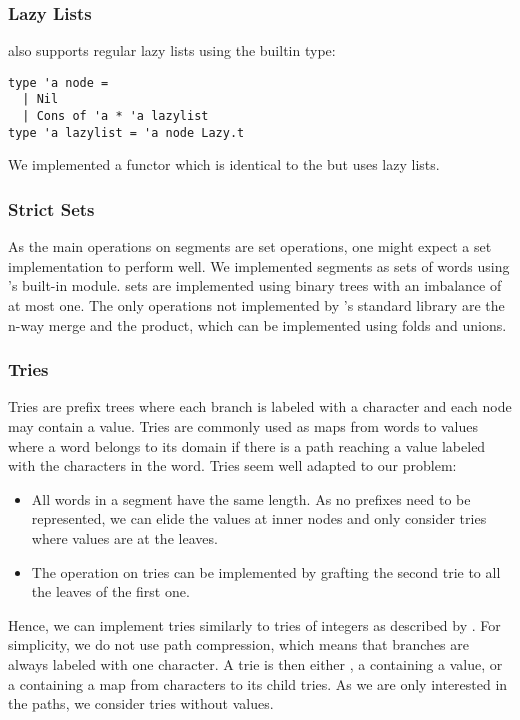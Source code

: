 \subsubsection{Lazy Lists}

\ocaml also supports regular lazy lists using the builtin  type:

\begin{lstlisting}
type 'a node =
  | Nil
  | Cons of 'a * 'a lazylist
type 'a lazylist = 'a node Lazy.t
\end{lstlisting}

We implemented a  functor which is identical to the
 but uses lazy lists.

\subsubsection{Strict Sets}

As the main operations on segments are set operations, one might 
expect a set implementation to perform well. We implemented segments as sets
of words using \ocaml's built-in  module. \ocaml sets are implemented
using binary trees with an imbalance of at most one.
The only operations not implemented by \ocaml's standard library are
the n-way merge and the product, which can be implemented using folds and unions.

\subsubsection{Tries}

Tries \cite{Fredkin1960} are prefix trees where each branch is labeled
with a character and each node may contain a value. Tries are commonly used
as maps from words to values where a word belongs to its domain if there is a
path reaching a value labeled with the characters in the word.
Tries seem well adapted to our problem:
\begin{itemize}[leftmargin=*]
\item All words in a segment have the same length. As no prefixes need
  to be represented, we can elide the values at inner nodes and only consider
  tries
  where values are at the leaves.
\item The  operation on tries can be implemented by
  grafting the second trie to all the leaves of the first one.
\end{itemize}

Hence, we can implement tries similarly to tries of integers as described
by \citet{Okasaki98fastmergeable}.
For simplicity, we do not use path compression, which means
that branches are always labeled with one character.
A trie is then either , a  containing a value, or a  containing a map from characters
to its child tries. As we are only interested in the paths, we consider tries
without values. 

